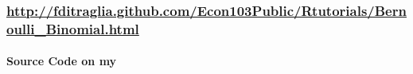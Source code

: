 \documentclass[handout]{beamer}
\begin{document}
\begin{frame}
	\frametitle{\href{http://fditraglia.github.com/Econ103Public/Rtutorials/Bernoulli_Binomial.html}{\small http://fditraglia.github.com/Econ103Public/Rtutorials/Bernoulli\_Binomial.html}}

\framesubtitle{Source Code on my \href{https://github.com/fditraglia/Econ103Public/blob/master/Rtutorials/Bernoulli_Binomial.R}{}}



\begin{figure}
\end{figure}

\end{frame}

\end{document}
